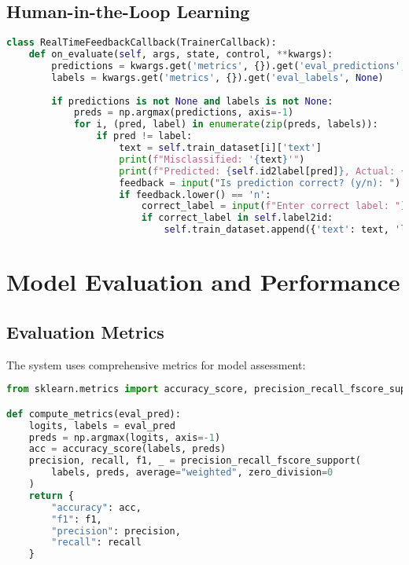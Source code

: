 \documentclass[11pt,a4paper]{article}
\begin{document}
\subsection{Human-in-the-Loop Learning}
\begin{lstlisting}[style=code,language=Python]
class RealTimeFeedbackCallback(TrainerCallback):
    def on_evaluate(self, args, state, control, **kwargs):
        predictions = kwargs.get('metrics', {}).get('eval_predictions', None)
        labels = kwargs.get('metrics', {}).get('eval_labels', None)
        
        if predictions is not None and labels is not None:
            preds = np.argmax(predictions, axis=-1)
            for i, (pred, label) in enumerate(zip(preds, labels)):
                if pred != label:
                    text = self.train_dataset[i]['text']
                    print(f"Misclassified: '{text}'")
                    print(f"Predicted: {self.id2label[pred]}, Actual: {self.id2label[label]}")
                    feedback = input("Is prediction correct? (y/n): ")
                    if feedback.lower() == 'n':
                        correct_label = input(f"Enter correct label: ")
                        if correct_label in self.label2id:
                            self.train_dataset.append({'text': text, 'label': correct_label})
\end{lstlisting}

\section{Model Evaluation and Performance}

\subsection{Evaluation Metrics}
The system uses comprehensive metrics for model assessment:

\begin{lstlisting}[style=code,language=Python]
from sklearn.metrics import accuracy_score, precision_recall_fscore_support

def compute_metrics(eval_pred):
    logits, labels = eval_pred
    preds = np.argmax(logits, axis=-1)
    acc = accuracy_score(labels, preds)
    precision, recall, f1, _ = precision_recall_fscore_support(
        labels, preds, average="weighted", zero_division=0
    )
    return {
        "accuracy": acc, 
        "f1": f1, 
        "precision": precision, 
        "recall": recall
    }
\end{lstlisting}
\end{document}

